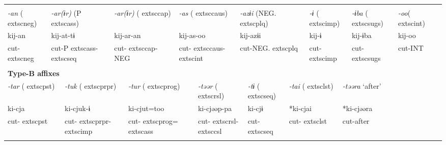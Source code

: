 \tabletail{}
\tablelasttail{}
\begin{tabularx}{\textwidth}{XXXXXXXXXXXXXXXXXXXXXX}
\lsptoprule
\multicolumn{22}{X}{{\bfseries Type-A affixes}}\\
{ \textit{{}-an} (	extsc{neg})} & \multicolumn{4}{X}{{ \textit{{}-ar(ɨr)} (P	extsc{ass})}} & \multicolumn{4}{X}{{ \textit{{}-ar(ɨr)} (	extsc{cap})}} & \multicolumn{4}{X}{{ \textit{{}-as} (	extsc{caus})}} & \multicolumn{4}{X}{{ \textit{{}-azɨi} (NEG.	extsc{plq})}} & \multicolumn{2}{X}{{ \textit{{}-ɨ} (	extsc{imp})}} & { \textit{{}-ɨba} (	extsc{sugs})} & { \textit{{}-oo}(	extsc{int})} & \\
{ kij-an} & \multicolumn{4}{X}{{ kij-at-tɨ}} & \multicolumn{4}{X}{{ kij-ar-an}} & \multicolumn{4}{X}{{ kij-as-oo}} & \multicolumn{4}{X}{{ kij-azɨi}} & \multicolumn{2}{X}{{ kij-ɨ}} & { kij-ɨba} & { kij-oo} & \\
cut-	extsc{neg} & \multicolumn{4}{X}{cut-P	extsc{ass}-	extsc{seq}} & \multicolumn{4}{X}{cut-	extsc{cap}-NEG} & \multicolumn{4}{X}{cut-	extsc{caus}-	extsc{int}} & \multicolumn{4}{X}{cut-NEG.	extsc{plq}} & \multicolumn{2}{X}{cut-	extsc{imp}} & cut-	extsc{sugs} & cut-INT & \\
\multicolumn{22}{X}{}\\
\multicolumn{22}{X}{{\bfseries Type-B affixes}}\\
\multicolumn{2}{X}{{ \textit{{}-tar} (	extsc{pst})}} & \multicolumn{4}{X}{{ \textit{{}-tuk} (	extsc{prpr})}} & \multicolumn{4}{X}{{ \textit{{}-tur} (	extsc{prog})}} & \multicolumn{4}{X}{{ \textit{{}-təər} (	extsc{rsl})}} & \multicolumn{2}{X}{{ \textit{{}-tɨ} (	extsc{seq})}} & \multicolumn{2}{X}{{ \textit{{}-tai} (	extsc{lst})}} & \multicolumn{4}{X}{{ \textit{{}-təəra} ‘after’}}\\
\multicolumn{2}{X}{{ ki-cja}} & \multicolumn{4}{X}{{ ki-cjuk-ɨ}} & \multicolumn{4}{X}{{ ki-cjut=too}} & \multicolumn{4}{X}{{ ki-cjəəp-pa}} & \multicolumn{2}{X}{{ ki-cjɨ}} & \multicolumn{2}{X}{{ *ki-cjai}} & \multicolumn{4}{X}{{ *ki-cjəəra}}\\
\multicolumn{2}{X}{cut-	extsc{pst}} & \multicolumn{4}{X}{cut-	extsc{prpr}-	extsc{imp}} & \multicolumn{4}{X}{cut-	extsc{prog}=	extsc{ass}} & \multicolumn{4}{X}{cut-	extsc{rsl}-	extsc{csl}} & \multicolumn{2}{X}{cut-	extsc{seq}} & \multicolumn{2}{X}{cut-	extsc{lst}} & \multicolumn{4}{X}{{ cut-after}}\\
\multicolumn{2}{X}{} & \multicolumn{4}{X}{} & \multicolumn{4}{X}{} & \multicolumn{4}{X}{} & \multicolumn{2}{X}{} & \multicolumn{2}{X}{} & \multicolumn{4}{X}{}\\

\end{tabularx}
